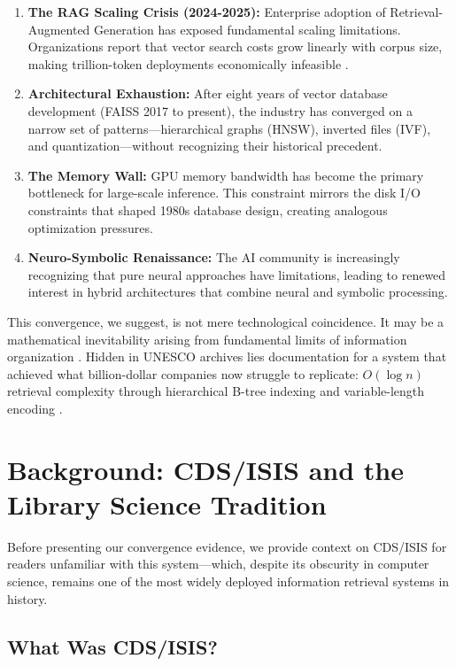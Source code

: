 \documentclass[manuscript,screen,nonacm]{acmart}
\begin{document}
\begin{enumerate}
    \item \textbf{The RAG Scaling Crisis (2024-2025):} Enterprise adoption of Retrieval-Augmented Generation has exposed fundamental scaling limitations. Organizations report that vector search costs grow linearly with corpus size, making trillion-token deployments economically infeasible \cite{bruckhaus2024}.

    \item \textbf{Architectural Exhaustion:} After eight years of vector database development (FAISS 2017 to present), the industry has converged on a narrow set of patterns---hierarchical graphs (HNSW), inverted files (IVF), and quantization---without recognizing their historical precedent.

    \item \textbf{The Memory Wall:} GPU memory bandwidth has become the primary bottleneck for large-scale inference. This constraint mirrors the disk I/O constraints that shaped 1980s database design, creating analogous optimization pressures.

    \item \textbf{Neuro-Symbolic Renaissance:} The AI community is increasingly recognizing that pure neural approaches have limitations, leading to renewed interest in hybrid architectures that combine neural and symbolic processing.
\end{enumerate}

This convergence, we suggest, is not mere technological coincidence. It may be a mathematical inevitability arising from fundamental limits of information organization \cite{weller2025}. Hidden in UNESCO archives lies documentation for a system that achieved what billion-dollar companies now struggle to replicate: $O(\log n)$ retrieval complexity through hierarchical B-tree indexing and variable-length encoding \cite{unesco1989}.

\section{Background: CDS/ISIS and the Library Science Tradition}

Before presenting our convergence evidence, we provide context on CDS/ISIS for readers unfamiliar with this system---which, despite its obscurity in computer science, remains one of the most widely deployed information retrieval systems in history.

\subsection{What Was CDS/ISIS?}
\end{document}
